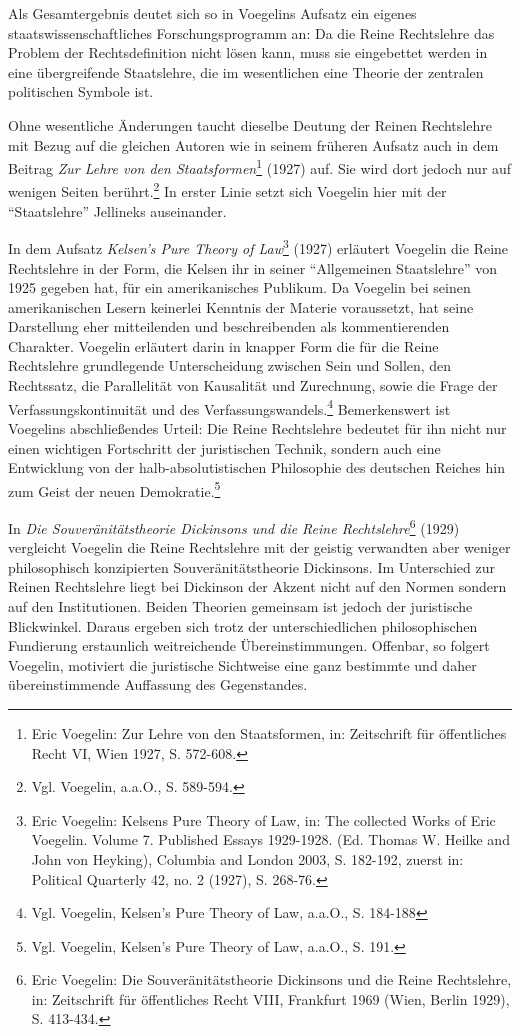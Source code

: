 \documentclass[12pt,a4paper,ngerman]{article}
\begin{document}
Als Gesamtergebnis deutet sich so in Voegelins Aufsatz ein eigenes
staatswissenschaftliches Forschungsprogramm an: Da die Reine
Rechtslehre das Problem der Rechtsdefinition nicht lösen kann, muss
sie eingebettet werden in eine übergreifende Staatslehre, die im
wesentlichen eine Theorie der zentralen politischen Symbole ist.

Ohne wesentliche Änderungen taucht dieselbe Deutung der Reinen Rechtslehre mit
Bezug auf die gleichen Autoren wie in seinem früheren Aufsatz auch in dem
Beitrag {\em Zur Lehre von den Staatsformen}\footnote{Eric Voegelin: Zur Lehre
  von den Staatsformen, in: Zeitschrift für öffentliches Recht VI, Wien 1927,
  S. 572-608.} (1927) auf. Sie wird dort jedoch nur auf wenigen Seiten
berührt.\footnote{Vgl. Voegelin, a.a.O., S. 589-594.} In erster Linie setzt
sich Voegelin hier mit der "`Staatslehre"' Jellineks auseinander.

In dem Aufsatz {\em Kelsen's Pure Theory of Law}\footnote{Eric
  Voegelin: Kelsens Pure Theory of Law, in: The collected Works of
  Eric Voegelin. Volume 7. Published Essays 1929-1928. (Ed.  Thomas W.
  Heilke and John von Heyking), Columbia and London 2003, S.  182-192,
  zuerst in: Political Quarterly 42, no. 2 (1927), S.  268-76.} (1927)
erläutert Voegelin die Reine Rechtslehre in der Form, die Kelsen ihr
in seiner "`Allgemeinen Staatslehre"' von 1925 gegeben hat, für ein
amerikanisches Publikum.  Da Voegelin bei seinen amerikanischen Lesern
keinerlei Kenntnis der Materie voraussetzt, hat seine Darstellung eher
mitteilenden und beschreibenden als kommentierenden Charakter.
Voegelin erläutert darin in knapper Form die für die Reine Rechtslehre
grundlegende Unterscheidung zwischen Sein und Sollen, den Rechtssatz,
die Parallelität von Kausalität und Zurechnung, sowie die Frage der
Verfassungskontinuität und des Verfassungswandels.\footnote{Vgl.
  Voegelin, Kelsen's Pure Theory of Law, a.a.O., S. 184-188}
Bemerkenswert ist Voegelins abschließendes Urteil: Die Reine
Rechtslehre bedeutet für ihn nicht nur einen wichtigen Fortschritt der
juristischen Technik, sondern auch eine Entwicklung von der
halb-absolutistischen Philosophie des deutschen Reiches hin zum Geist
der neuen Demokratie.\footnote{Vgl. Voegelin, Kelsen's Pure Theory of
  Law, a.a.O., S. 191.}

In {\em Die Souveränitätstheorie Dickinsons und die Reine
  Rechtslehre}\footnote{Eric Voegelin: Die Souveränitätstheorie Dickinsons und
  die Reine Rechtslehre, in: Zeitschrift für öffentliches Recht VIII,
  Frankfurt 1969 (Wien, Berlin 1929), S. 413-434.} (1929) vergleicht Voegelin
die Reine Rechtslehre mit der geistig verwandten aber weniger philosophisch
konzipierten Souveränitätstheorie Dickinsons. Im Unterschied zur Reinen
Rechtslehre liegt bei Dickinson der Akzent nicht auf den Normen sondern auf
den Institutionen. Beiden Theorien gemeinsam ist jedoch der juristische
Blickwinkel. Daraus ergeben sich trotz der unterschiedlichen philosophischen
Fundierung erstaunlich weitreichende Übereinstimmungen. Offenbar, so folgert
Voegelin, motiviert die juristische Sichtweise eine ganz bestimmte und daher
übereinstimmende Auffassung des Gegenstandes.
\end{document}
